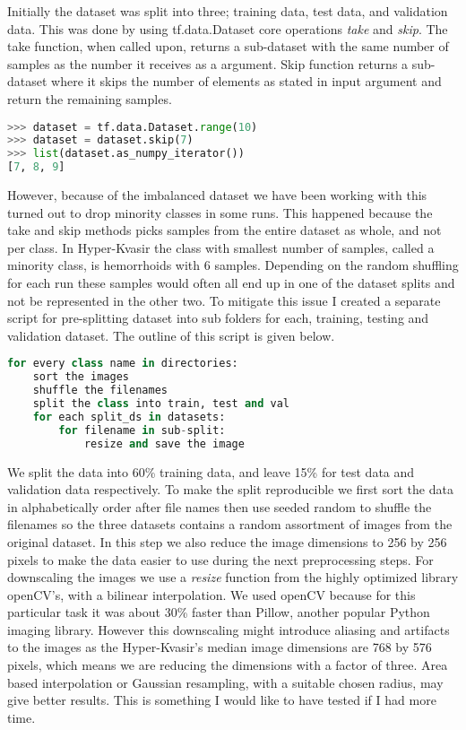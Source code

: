 \documentclass[thesis.tex]{subfiles}
\begin{document}
Initially the dataset was split into three; training data, test data, and validation data. This was done by using tf.data.Dataset core operations \textit{take} and \textit{skip}. The take function, when called upon, returns a sub-dataset with the same number of samples as the number it receives as a argument. Skip function returns a sub-dataset where it skips the number of elements as stated in input argument and return the remaining samples.

\begin{lstlisting}[language=Python]
>>> dataset = tf.data.Dataset.range(10)
>>> dataset = dataset.skip(7)
>>> list(dataset.as_numpy_iterator())
[7, 8, 9]
\end{lstlisting}

However, because of the imbalanced dataset we have been working with this turned out to drop minority classes in some runs. This happened because the take and skip methods picks samples from the entire dataset as whole, and not per class. In Hyper-Kvasir the class with smallest number of samples, called a minority class, is hemorrhoids with 6 samples. Depending on the random shuffling for each run these samples would often all end up in one of the dataset splits and not be represented in the other two.
To mitigate this issue I created a separate script for pre-splitting dataset into sub folders for each, training, testing and validation dataset. The outline of this script is given below.

\begin{lstlisting}[language=Python]
for every class name in directories:
	sort the images
	shuffle the filenames
	split the class into train, test and val
	for each split_ds in datasets:
		for filename in sub-split:
			resize and save the image
\end{lstlisting}

We split the data into 60\% training data, and leave 15\% for test data and validation data respectively. To make the split reproducible we first sort the data in alphabetically order after file names then use seeded random to shuffle the filenames so the three datasets contains a random assortment of images from the original dataset. 
In this step we also reduce the image dimensions to 256 by 256 pixels to make the data easier to use during the next preprocessing steps. For downscaling the images we use a \textit{resize} function from the highly optimized library openCV's, with a bilinear interpolation. We used openCV because for this particular task it was about 30\% faster than Pillow, another popular Python imaging library. However this downscaling might introduce aliasing and artifacts to the images as the Hyper-Kvasir's median image dimensions are 768 by 576 pixels, which means we are reducing the dimensions with a factor of three. Area based interpolation \cite{AreaBased99} or Gaussian resampling, with a suitable chosen radius, may give better results. This is something I would like to have tested if I had more time.
\end{document}
